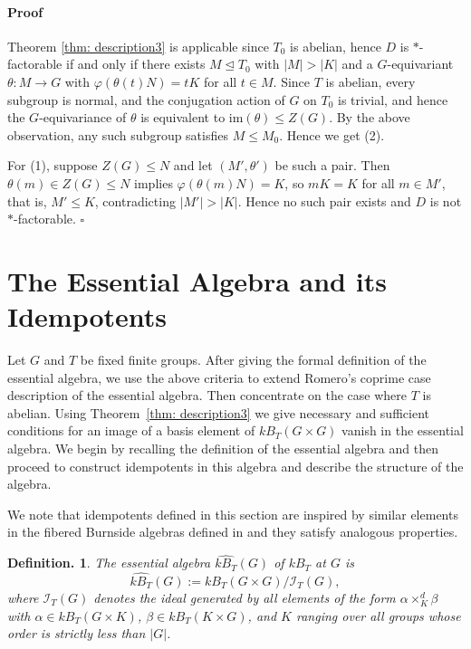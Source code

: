 \documentclass[12pt]{article}
\theoremstyle{change}
\newtheorem{defi}[theorem]{Definition.}
\newenvironment{proof}{\paragraph{Proof}}{\hfill$\square$}
\renewcommand{\le}{\leqslant} %
\newcommand{\calI}{\mathcal{I}}
\newcommand{\im}{\mathrm{im}}
\newcommand{\1}{{\bf 1}}
\begin{document}
\begin{proof}
Theorem \ref{thm: description3} is applicable since $T_0$ is abelian, hence $D$ is $\ast$-factorable if and only if there exists $M\unlhd T_0$ with $|M| > |K|$ and a $G$-equivariant $\theta: M\to G$ with $\varphi(\theta(t)N) = tK$ for all $t\in M$. Since $T$ is abelian, every subgroup is normal, and the conjugation action of $G$ on $T_0$ is trivial, and hence the $G$-equivariance of $\theta$ is equivalent to $\im(\theta)\le Z(G)$. By the above observation, any such subgroup satisfies $M\le M_0$. Hence we get (2).

For (1), suppose $Z(G)\le N$ and let $(M', \theta')$ be such a pair. Then $\theta(m) \in Z(G)\le N$ implies $\varphi(\theta(m)N) = K$, so $mK = K$ for all $m\in M'$, that is, $M'\le K$, contradicting $|M'|>|K|$. Hence no such pair exists and $D$ is not $\ast$-factorable.
\end{proof}




\section{The Essential Algebra and its Idempotents}



Let $G$ and $T$ be fixed finite groups. After giving the formal definition of the essential algebra, we use the above criteria to extend Romero's coprime case description of the essential algebra. Then concentrate on the case where $T$ is abelian. Using Theorem~\ref{thm: description3} we give necessary and sufficient conditions for an image of a basis element of \(kB_T(G\times G)\) vanish in the essential algebra. We begin by recalling the definition of the essential algebra and then proceed to construct idempotents in this algebra and describe the structure of the algebra. 

We note that idempotents defined in this section are inspired by similar elements in the fibered Burnside algebras defined in \cite{BC} and they satisfy analogous properties. 

\begin{defi}
The \emph{essential algebra} $\widehat{kB_T}(G)$ of $kB_T$ at $G$ is 
\[
\widehat{kB_T}(G) := kB_T(G \times G) \Big/ \calI_T(G),
\]
where $\calI_T(G)$ denotes the ideal generated by all elements of the form
$\alpha \times_K^d \beta$ with $\alpha \in kB_T(G \times K)$, $\beta \in kB_T(K \times G)$, and $K$ ranging over all groups whose order is strictly less than $|G|$.
\end{defi}
\end{document}
